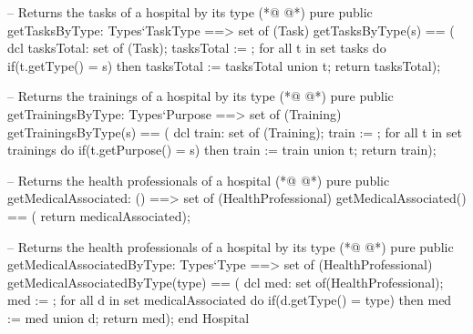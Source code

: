 \begin{vdmpp}[breaklines=true]
 -- Returns the tasks of a hospital by its type
(*@
\label{getTasksByType:126}
@*)
 pure public getTasksByType: Types`TaskType ==> set of (Task)
  getTasksByType(s) == (
   dcl tasksTotal: set of (Task);
   tasksTotal := {};
   for all t in set tasks do
    if(t.getType() = s)
     then tasksTotal := tasksTotal union {t};  
   return tasksTotal);
 
 -- Returns the trainings of a hospital by its type
(*@
\label{getTrainingsByType:136}
@*)
 pure public getTrainingsByType: Types`Purpose ==> set of (Training)
  getTrainingsByType(s) == (
   dcl train: set of (Training);
   train := {};
   for all t in set trainings do
    if(t.getPurpose() = s)
     then train := train union {t}; 
   return train);

 -- Returns the health professionals of a hospital
(*@
\label{getMedicalAssociated:146}
@*)
 pure public getMedicalAssociated: () ==> set of (HealthProfessional)
  getMedicalAssociated() == (
   return medicalAssociated);

 -- Returns the health professionals of a hospital by its type
(*@
\label{getMedicalAssociatedByType:151}
@*)
 pure public getMedicalAssociatedByType: Types`Type ==> set of (HealthProfessional)
  getMedicalAssociatedByType(type) == (
   dcl med: set of(HealthProfessional);
   med := {};
   for all d in set medicalAssociated do
    if(d.getType() = type)
     then med := med union {d};
   return med);
end Hospital
\end{vdmpp}
\bigskip
